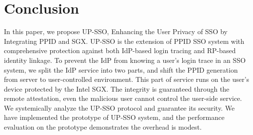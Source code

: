 \section{Conclusion}
\label{sec:conclusion}
In this paper, we propose UP-SSO, Enhancing the User Privacy of SSO by Integrating PPID and SGX.
UP-SSO is the extension of PPID SSO system with comprehensive protection against both IdP-based login tracing and RP-based identity linkage. To prevent the IdP from knowing a user's login trace in an SSO system, we split the IdP service into two parts, and shift the PPID generation from server to user-controlled environment.
This part of service runs on the user's device protected by the Intel SGX. The integrity is guaranteed through the remote attestation, even the malicious user cannot control the user-side service. 
We systemically analyze the UP-SSO protocol and guarantee its security. 
We have implemented the prototype of UP-SSO system, and the performance evaluation on the prototype demonstrates the  overhead is modest. 